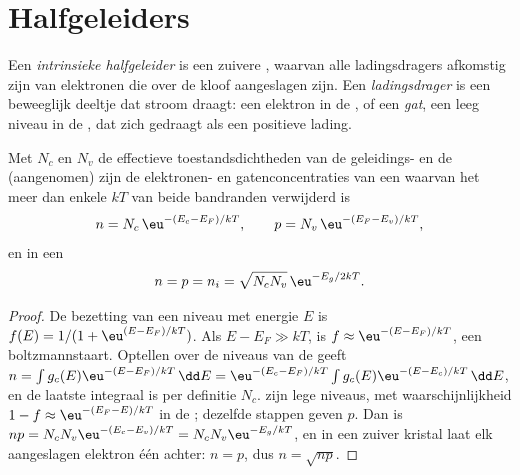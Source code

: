 \section{Halfgeleiders}

\begin{definition}[Ladingsdragers]\label{def:b3:solid-state:carriers}
Een \emph{intrinsieke halfgeleider} is een
zuivere , waarvan alle ladingsdragers afkomstig zijn van
elektronen die over de kloof aangeslagen zijn. Een
\emph{ladingsdrager} is een beweeglijk deeltje dat
stroom draagt: een elektron in de , of een
\emph{gat}, een leeg niveau in de , dat zich
gedraagt als een positieve lading.
\end{definition}

\begin{theorem}\label{thm:b3:solid-state:intrinsic}
Met $N_c$ en $N_v$ de effectieve toestandsdichtheden van de geleidings- en de
 (aangenomen) zijn de elektronen- en gatenconcentraties van
een  waarvan het  meer dan enkele $kT$ van beide bandranden verwijderd is
\[
  n = N_c\,\eu^{-(E_c - E_F)/kT}, \qquad p = N_v\,\eu^{-(E_F - E_v)/kT},
\]
en in een 
\[
  n = p = n_i = \sqrt{N_cN_v}\,\eu^{-E_g/2kT}.
\]
\end{theorem}

\begin{proof}
De bezetting van een niveau met energie $E$ is $f(E) = 1/(1 + \eu^{(E - E_F)/kT})$. Als
$E - E_F \gg kT$, is $f \approx \eu^{-(E - E_F)/kT}$, een boltzmannstaart. Optellen over de niveaus van de
 geeft $n = \int g_c(E)\eu^{-(E - E_F)/kT}\,\dd E = \eu^{-(E_c - E_F)/kT}\int g_c(E)\eu^{-(E - E_c)/kT}\,\dd E$, en de laatste integraal is per
definitie $N_c$.  zijn lege niveaus, met waarschijnlijkheid $1 - f \approx \eu^{-(E_F - E)/kT}$ in de
; dezelfde stappen geven $p$. Dan is $np = N_cN_v\eu^{-(E_c - E_v)/kT} = N_cN_v\eu^{-E_g/kT}$, en in een zuiver kristal
laat elk aangeslagen elektron één  achter: $n = p$, dus $n = \sqrt{np}$.
\end{proof}

